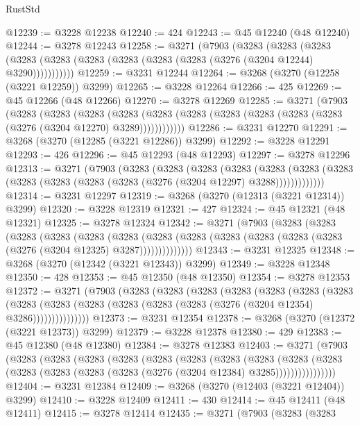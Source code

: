 \begin{lexlean}{RustStd}
\begin{coremodule}
@12239 := @3228 @12238
@12240 := 424
@12243 := @45 @12240 (@48 @12240)
@12244 := @3278 @12243
@12258 := @3271
    (@7903
      (@3283
        (@3283
          (@3283 (@3283 (@3283 (@3283 (@3283 (@3283 (@3283 (@3276 (@3204 @12244) @3290)))))))))))
@12259 := @3231 @12244
@12264 := @3268 (@3270 (@12258 (@3221 @12259)) @3299)
@12265 := @3228 @12264
@12266 := 425
@12269 := @45 @12266 (@48 @12266)
@12270 := @3278 @12269
@12285 := @3271
    (@7903
      (@3283
        (@3283
          (@3283
            (@3283 (@3283 (@3283 (@3283 (@3283 (@3283 (@3283 (@3276 (@3204 @12270) @3289))))))))))))
@12286 := @3231 @12270
@12291 := @3268 (@3270 (@12285 (@3221 @12286)) @3299)
@12292 := @3228 @12291
@12293 := 426
@12296 := @45 @12293 (@48 @12293)
@12297 := @3278 @12296
@12313 := @3271
    (@7903
      (@3283
        (@3283
          (@3283
            (@3283
              (@3283
                (@3283 (@3283 (@3283 (@3283 (@3283 (@3283 (@3276 (@3204 @12297) @3288)))))))))))))
@12314 := @3231 @12297
@12319 := @3268 (@3270 (@12313 (@3221 @12314)) @3299)
@12320 := @3228 @12319
@12321 := 427
@12324 := @45 @12321 (@48 @12321)
@12325 := @3278 @12324
@12342 := @3271
    (@7903
      (@3283
        (@3283
          (@3283
            (@3283
              (@3283
                (@3283
                  (@3283
                    (@3283 (@3283 (@3283 (@3283 (@3283 (@3276 (@3204 @12325) @3287))))))))))))))
@12343 := @3231 @12325
@12348 := @3268 (@3270 (@12342 (@3221 @12343)) @3299)
@12349 := @3228 @12348
@12350 := 428
@12353 := @45 @12350 (@48 @12350)
@12354 := @3278 @12353
@12372 := @3271
    (@7903
      (@3283
        (@3283
          (@3283
            (@3283
              (@3283
                (@3283
                  (@3283
                    (@3283
                      (@3283 (@3283 (@3283 (@3283 (@3283 (@3276 (@3204 @12354) @3286)))))))))))))))
@12373 := @3231 @12354
@12378 := @3268 (@3270 (@12372 (@3221 @12373)) @3299)
@12379 := @3228 @12378
@12380 := 429
@12383 := @45 @12380 (@48 @12380)
@12384 := @3278 @12383
@12403 := @3271
    (@7903
      (@3283
        (@3283
          (@3283
            (@3283
              (@3283
                (@3283
                  (@3283
                    (@3283
                      (@3283
                        (@3283
                          (@3283 (@3283 (@3283 (@3283 (@3276 (@3204 @12384) @3285))))))))))))))))
@12404 := @3231 @12384
@12409 := @3268 (@3270 (@12403 (@3221 @12404)) @3299)
@12410 := @3228 @12409
@12411 := 430
@12414 := @45 @12411 (@48 @12411)
@12415 := @3278 @12414
@12435 := @3271
    (@7903
      (@3283
        (@3283

\end{coremodule}
\end{lexlean}
